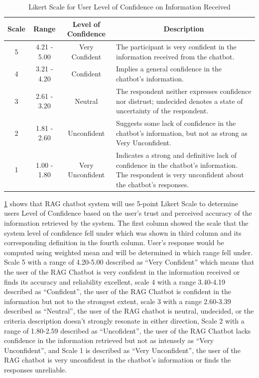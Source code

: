 \begin{refsection}
\begin{table}[H] %
    \centering
    \caption{Likert Scale for User Level of Confidence on Information Received}
    \label{tab:confidence_scale}
    \footnotesize
    \begin{tabular}{cccp{7cm}}
        \hline
        \textbf{Scale} & \textbf{Range} & \textbf{Level of Confidence} & \multicolumn{1}{c}{\textbf{Description}} \\
        \hline
        5 & 4.21 - 5.00 & Very Confident & The participant is very confident in the information received from the chatbot.\\
        \hline
        4 & 3.21 - 4.20 & Confident & Implies a general confidence in the chatbot's information.\\
        \hline
        3 & 2.61 - 3.20 & Neutral & The respondent neither expresses confidence nor distrust; undecided denotes a state of uncertainty of the respondent.\\
        \hline
        2 & 1.81 - 2.60 & Unconfident & Suggests some lack of confidence in the chatbot's information, but not as strong as Very Unconfident.\\
        \hline
        1 & 1.00 - 1.80 & Very Unconfident & Indicates a strong and definitive lack of confidence in the chatbot's information. The respondent is very unconfident about the chatbot's responses.\\
        \hline
    \end{tabular}
\end{table}

\ref{tab:confidence_scale} shows that RAG chatbot system will use 5-point Likert Scale to determine users Level of Confidence based on the user’s trust and perceived accuracy of the information retrieved by the system. The first column showed the scale that the system level of confidence fell under which was shown in third column and its corresponding definition in the fourth column. User’s response would be computed using weighted mean and will be determined in which range fell under. Scale 5 with a range of 4.20-5.00 described as “Very Confident” which means that the user of the RAG Chatbot is very confident in the information received or finds its accuracy and reliability excellent, scale 4 with a range 3.40-4.19 described as “Confident”, the user of the RAG Chatbot is confident in the information but not to the strongest extent, scale 3 with a range 2.60-3.39 described as “Neutral”, the user of the RAG chatbot is neutral, undecided, or the criteria description doesn’t strongly resonate in either direction, Scale 2 with a range of 1.80-2.59 described as “Uncofident”, the user of the RAG Chatbot lacks confidence in the information retrieved but not as intensely as “Very Unconfident”, and Scale 1 is described as “Very Unconfident”, the user of the RAG chatbot is very unconfident in the chatbot's information or finds the responses unreliable.


\end{refsection}
